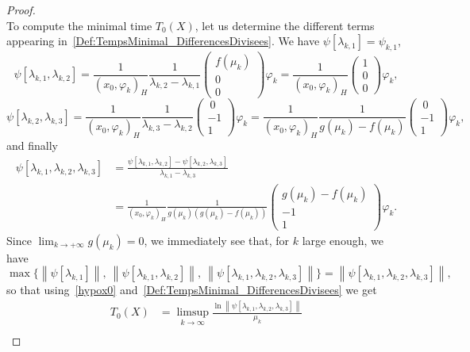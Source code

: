 \documentclass[11pt]{article}
\theoremstyle{definition}
\numberwithin{equation}{section}
\numberwithin{figure}{section}
\numberwithin{table}{section}
\newcommand{\normeX}[1]{\left\| #1 \right\|}
\newcommand{\psH}[2]{\left(#1, #2 \right)_H}
\begin{document}
\begin{proof}
\[\]
To compute the minimal time $T_0(X)$, let us determine the different terms appearing in~\eqref{Def:TempsMinimal_DifferencesDivisees}. We have $\psi[\lambda_{k,1}]=\psi_{k,1}$,
\[
\psi[\lambda_{k,1}, \lambda_{k,2}] = \frac{1}{\psH{x_0}{\varphi_k}} \frac{1}{\lambda_{k,2}-\lambda_{k,1}}
\begin{pmatrix}
f(\mu_k) \\ 0 \\ 0
\end{pmatrix} \varphi_k = \frac{1}{\psH{x_0}{\varphi_k}}
\begin{pmatrix}
1 \\ 0 \\ 0
\end{pmatrix} \varphi_k,
\]
\[
\psi[\lambda_{k,2}, \lambda_{k,3}] = \frac{1}{\psH{x_0}{\varphi_k}} \frac{1}{\lambda_{k,3}-\lambda_{k,2}}
\begin{pmatrix}
\ 0\\-1\\1
\end{pmatrix} \varphi_k
= \frac{1}{\psH{x_0}{\varphi_k}} \frac{1}{g(\mu_k) - f(\mu_k)}
\begin{pmatrix}
\ 0\\-1\\1
\end{pmatrix} \varphi_k,
\]
and finally
\begin{align*}
\psi[\lambda_{k,1},\lambda_{k,2},\lambda_{k,3}] &= \frac{\psi[\lambda_{k,1},\lambda_{k,2}]-\psi[\lambda_{k,2},\lambda_{k,3}]}{\lambda_{k,1}-\lambda_{k,3}}
\\
&= \frac{1}{\psH{x_0}{\varphi_k}} \frac{1}{g(\mu_k) \left(g(\mu_k)-f(\mu_k) \right)}
\begin{pmatrix} g(\mu_k)-f(\mu_k) \\ -1 \\ 1
\end{pmatrix} \varphi_k.
\end{align*}
Since $\lim_{k\to +\infty} g(\mu_k)=0$, we immediately see that, for $k$ large enough, we have
\[
\max \big\{ \normeX{\psi[\lambda_{k,1}]}, \: \normeX{\psi[\lambda_{k,1},\lambda_{k,2}]}, \: \normeX{\psi[\lambda_{k,1},\lambda_{k,2},\lambda_{k,3}]} \big\} = \normeX{\psi[\lambda_{k,1},\lambda_{k,2},\lambda_{k,3}]},
\]
so that using~\eqref{hypox0} and~\eqref{Def:TempsMinimal_DifferencesDivisees} we get
\begin{equation}\label{T0_fg}
\begin{aligned}
T_0(X) &= \limsup_{k \to \infty} \frac{ \ln \normeX{ \psi[\lambda_{k,1}, \lambda_{k,2}, \lambda_{k,3}]} }{\mu_k} \\

\end{aligned}
\end{equation}
\end{proof}
\end{document}
